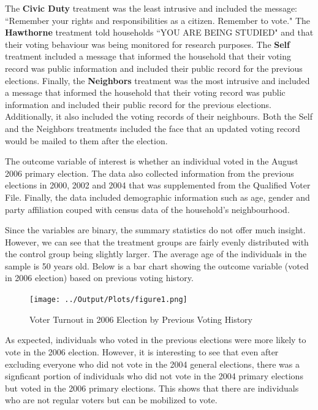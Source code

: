 \documentclass[11pt, draft]{article}
\begin{document}
The \textbf{Civic Duty} treatment was the least intrusive and included the message: ``Remember your rights and responsibilities as a citizen. Remember to vote." The \textbf{Hawthorne} treatment told households ``YOU ARE BEING STUDIED" and that their voting behaviour was being monitored for research purposes. The \textbf{Self} treatment included a message that informed the household that their voting record was public information and included their public record for the previous elections. Finally, the \textbf{Neighbors} treatment was the most intrusive and included a message that informed the household that their voting record was public information and included their public record for the previous elections. Additionally, it also included the voting records of their neighbours.
Both the Self and the Neighbors treatments included the face that an updated voting record would be mailed to them after the election.

The outcome variable of interest is whether an individual voted in the August 2006 primary election. The data also collected information from the previous elections in 2000, 2002 and 2004 that was supplemented from the Qualified Voter File. Finally, the data included demographic information such as age, gender and party affiliation couped with census data of the household's neighbourhood.


Since the variables are binary, the summary statistics do not offer much insight. However, we can see that the treatment groups are fairly evenly distributed with the control group being slightly larger. The average age of the individuals in the sample is 50 years old. Below is a bar chart showing the outcome variable (voted in 2006 election) based on previous voting history.
\begin{figure}[H]
    \centering
    \texttt{[image: ../Output/Plots/figure1.png]}   
    \caption{Voter Turnout in 2006 Election by Previous Voting History}
    \label{fig:figure1}
\end{figure}

As expected, individuals who voted in the previous elections were more likely to vote in the 2006 election. However, it is interesting to see that even after excluding everyone who did not vote in the 2004 general elections, there was a signficant portion of individuals who did not vote in the 2004 primary elections but voted in the 2006 primary elections. This shows that there are individuals who are not regular voters but can be mobilized to vote. 
\end{document}
